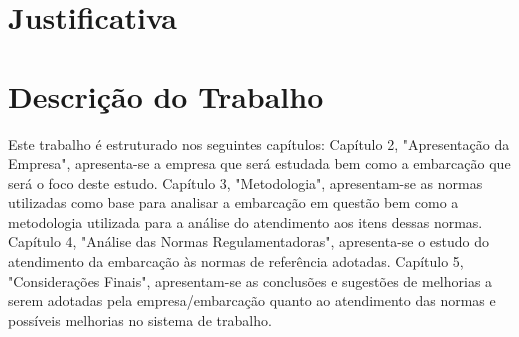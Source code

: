 \section{Justificativa}

\section{Descrição do Trabalho}
Este trabalho é estruturado nos seguintes capítulos:
Capítulo 2, "Apresentação da Empresa", apresenta-se a empresa que será estudada bem como a embarcação que será o foco deste estudo.
Capítulo 3, "Metodologia", apresentam-se as normas utilizadas como base para analisar a embarcação em questão bem como a  metodologia utilizada para a análise do atendimento aos itens dessas normas. 
Capítulo 4, "Análise das Normas Regulamentadoras", apresenta-se o estudo do atendimento da embarcação às normas de referência adotadas. 
Capítulo 5, "Considerações Finais",  apresentam-se as conclusões e sugestões de melhorias a serem adotadas pela empresa/embarcação quanto ao atendimento das normas e possíveis melhorias no sistema de trabalho.


